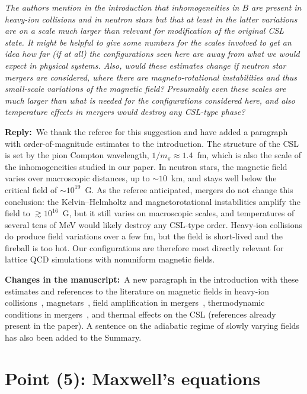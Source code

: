 \documentclass[11pt,a4paper]{article}
\newenvironment{referee}{\par\medskip\noindent\color{black!70}\itshape}{\par\medskip}
\newcommand{\reply}{\noindent\textbf{Reply:}\ }
\newcommand{\changes}{\par\smallskip\noindent\textbf{Changes in the manuscript:}\ }
\begin{document}
\begin{referee}
The authors mention in the introduction that inhomogeneities in $B$ are present in heavy-ion collisions and in neutron stars but that at least in the latter variations are on a scale much larger than relevant for modification of the original CSL state. It might be helpful to give some numbers for the scales involved to get an idea how far (if at all) the configurations seen here are away from what we would expect in physical systems. Also, would these estimates change if neutron star mergers are considered, where there are magneto-rotational instabilities and thus small-scale variations of the magnetic field? Presumably even these scales are much larger than what is needed for the configurations considered here, and also temperature effects in mergers would destroy any CSL-type phase?
\end{referee}

\reply We thank the referee for this suggestion and have added a paragraph with order-of-magnitude estimates to the introduction. The structure of the CSL is set by the pion Compton wavelength, $1/m_\pi\approx1.4$~fm, which is also the scale of the inhomogeneities studied in our paper. In neutron stars, the magnetic field varies over macroscopic distances, up to $\sim10$~km, and stays well below the critical field of $\sim10^{19}$~G. As the referee anticipated, mergers do not change this conclusion: the Kelvin--Helmholtz and magnetorotational instabilities amplify the field to $\gtrsim10^{16}$~G, but it still varies on macroscopic scales, and temperatures of several tens of MeV would likely destroy any CSL-type order. Heavy-ion collisions do produce field variations over a few fm, but the field is short-lived and the fireball is too hot. Our configurations are therefore most directly relevant for lattice QCD simulations with nonuniform magnetic fields.

\changes A new paragraph in the introduction with these estimates and references to the literature on magnetic fields in heavy-ion collisions~\cite{Kharzeev:2007jp,Skokov:2009qp,Deng:2012pc}, magnetars~\cite{Kaspi:2017fwg}, field amplification in mergers~\cite{Price:2006fi,Kiuchi:2015sga}, thermodynamic conditions in mergers~\cite{Perego:2019adq}, and thermal effects on the CSL (references already present in the paper). A sentence on the adiabatic regime of slowly varying fields has also been added to the Summary.

\section*{Point (5): Maxwell's equations}
\end{document}
